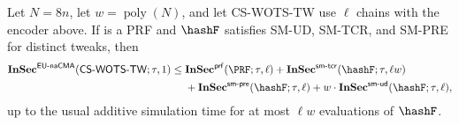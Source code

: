\begin{theorem}
\label{thm:proof-cswots-single}
Let $N=8n$, let $w=\operatorname{poly}(N)$, and let CS-WOTS-TW use $\ell$
chains with the encoder above.  If \PRF is a PRF and $\hashF$ satisfies SM-UD,
SM-TCR, and SM-PRE for distinct tweaks, then
\begin{align}
\InSec{EU\text{-}naCMA}(\mathsf{CS\text{-}WOTS\text{-}TW};\tau,1)
\le{}&
    \InSec{prf}(\PRF;\tau,\ell)
    +\InSec{sm\text{-}tcr}(\hashF;\tau,\ell w) \notag\\
&   +\InSec{sm\text{-}pre}(\hashF;\tau,\ell)
    +w\cdot\InSec{sm\text{-}ud}(\hashF;\tau,\ell),
\label{eq:proof-cswots-single}
\end{align}
up to the usual additive simulation time for at most $\ell w$ evaluations of
$\hashF$.
\end{theorem}

